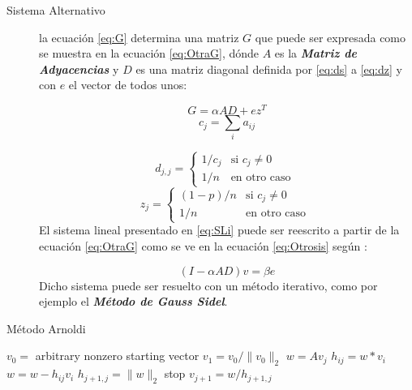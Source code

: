 \documentclass{article}
\begin{document}
\begin{description}
\begin{enumerate}
\end{enumerate}

\item[Sistema Alternativo] la ecuación \ref{eq:G} determina una matriz $G$ que puede ser expresada como se muestra en la ecuación \ref{eq:OtraG}, dónde $A$ es la \textbf{\textit{Matriz de Adyacencias}} y $D$ es una matriz diagonal definida por \ref{eq:ds} a \ref{eq:dz} y con $e$ el vector de todos unos: 

  \begin{equation} \label{eq:OtraG}
G = \alpha AD + ez^T
\end{equation}
\begin{equation} \label{eq:dc}
c_{j} = \sum_{i}{a_{ij}}
\end{equation}

\begin{equation} \label{eq:ds}
d_{j,j} =
\left\{
	\begin{array}{ll}
		1/c_{j}  & \mbox{si $c_{j} \neq 0$ }\\
		1/n & \mbox{en otro caso } 
	\end{array}
\right.
\end{equation}
\begin{equation} \label{eq:dz}
z_{j} =
\left\{
	\begin{array}{ll}
		(1-p)/n  & \mbox{si $c_{j} \neq 0$ }\\
		1/n & \mbox{en otro caso } 
	\end{array}
\right.
\end{equation}
El sistema lineal presentado en \ref{eq:SLi} puede ser reescrito a partir de la ecuación \ref{eq:OtraG} como se ve en la ecuación \ref{eq:Otrosis} según \cite{Sangers2015192}:

  \begin{equation} \label{eq:Otrosis}
(I - \alpha AD)v = \beta e
\end{equation}
Dicho sistema puede ser resuelto con un método iterativo, como por ejemplo el \textit{\textbf{Método de Gauss Sidel}}.


\end{description}

\begin{algorithm}[h!]
\caption{Método Arnoldi}\label{alg:arnoldi}
\begin{algorithmic}[1]
\State $v_{0} = $ arbitrary nonzero starting vector
\State $v_{1} = v_{0}/\|v_{0}\|_{2}$ 
\State $w = Av_{j}$
\State $h_{ij} = w*v_{i}$
\State $w = w - h_{ij}v_{i}$
\EndFor
\State $h_{j+1,j} = \|w\|_{2}$
stop
\EndIf
\State $v_{j+1} = w/h_{j+1,j}$
\EndFor
\EndProcedure
\end{algorithmic}
\end{algorithm}
\end{document}
